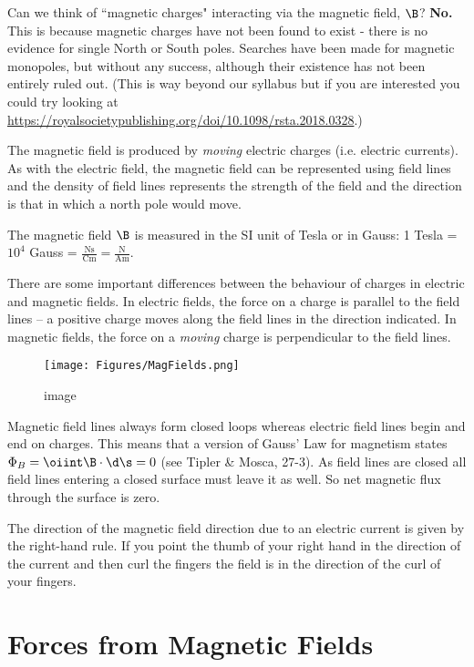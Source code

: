 \documentclass[
]{book}
\theoremstyle{definition}
\theoremstyle{definition}
\theoremstyle{definition}
\theoremstyle{definition}
\theoremstyle{remark}
\begin{document}
Can we think of ``magnetic charges" interacting via the magnetic field,
\(\B\)? \textbf{No.} This is because magnetic charges have not been found to
exist - there is no evidence for single North or South poles. Searches
have been made for magnetic monopoles, but without any success, although
their existence has not been entirely ruled out. (This is way beyond our
syllabus but if you are interested you could try looking at
\url{https://royalsocietypublishing.org/doi/10.1098/rsta.2018.0328}.)

The magnetic field is produced by \emph{moving} electric charges (i.e.
electric currents). As with the electric field, the magnetic field can
be represented using field lines and the density of field lines
represents the strength of the field and the direction is that in which
a north pole would move.

The magnetic field \(\B\) is measured in the SI unit of Tesla or in Gauss:
1 Tesla = \(10^4\) Gauss =
\(\frac{\mathrm{Ns}}{\mathrm{Cm}} = \frac{\mathrm{N}}{\mathrm{Am}}\).

There are some important differences between the behaviour of charges in
electric and magnetic fields. In electric fields, the force on a charge
is parallel to the field lines -- a positive charge moves along the
field lines in the direction indicated. In magnetic fields, the force on
a \emph{moving} charge is perpendicular to the field lines.

\begin{figure}
\centering
\texttt{[image: Figures/MagFields.png]}
\caption{image}
\end{figure}

Magnetic field lines always form closed loops whereas electric field
lines begin and end on charges. This means that a version of Gauss' Law
for magnetism states \(\Phi_B = \oiint \B \cdot \d\s = 0\) (see Tipler \&
Mosca, 27-3). As field lines are closed all field lines entering a
closed surface must leave it as well. So net magnetic flux through the
surface is zero.

The direction of the magnetic field direction due to an electric current
is given by the right-hand rule. If you point the thumb of your right
hand in the direction of the current and then curl the fingers the field
is in the direction of the curl of your fingers.

\hypertarget{forces-from-magnetic-fields}{%
\section{Forces from Magnetic Fields}\label{forces-from-magnetic-fields}}
\end{document}
